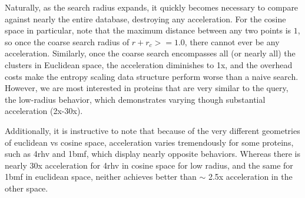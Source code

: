 \documentclass[review,preprint,12pt]{elsarticle}
\theoremstyle{definition}
\theoremstyle{remark}
\numberwithin{equation}{section}
\begin{document}
Naturally, as the search radius expands, it quickly becomes necessary to compare against nearly the entire database, destroying any acceleration.
For the cosine space in particular, note that the maximum distance between any two points is $1$, so once the coarse search radius of $r+r_c >= 1.0$, there cannot ever be any acceleration.
Similarly, once the coarse search encompasses all (or nearly all) the clusters in Euclidean space, the acceleration diminishes to 1x, and the overhead costs make the entropy scaling data structure perform worse than a naive search.
However, we are most interested in proteins that are very similar to the query, the low-radius behavior, which demonstrates varying though substantial acceleration (2x-30x).

Additionally, it is instructive to note that because of the very different geometries of euclidean vs cosine space, acceleration varies tremendously for some proteins, such as 4rhv and 1bmf, which display nearly opposite behaviors.
Whereas there is nearly 30x acceleration for 4rhv in cosine space for low radius, and the same for 1bmf in euclidean space, neither achieves better than $\sim$ 2.5x acceleration in the other space.
\end{document}
